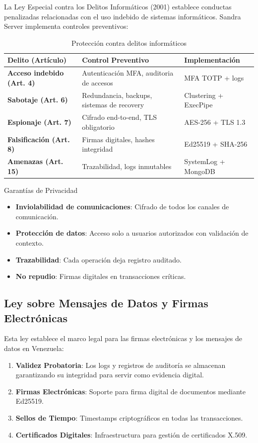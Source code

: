 La Ley Especial contra los Delitos Informáticos (2001) establece conductas penalizadas relacionadas con el uso indebido de sistemas informáticos. Sandra Server implementa controles preventivos:

\begin{table}[H]
\centering
\caption{Protección contra delitos informáticos}
\begin{tabular}{|l|p{6cm}|p{4cm}|}
\hline
\textbf{Delito (Artículo)} & \textbf{Control Preventivo} & \textbf{Implementación} \\ \hline
\textbf{Acceso indebido (Art. 4)} & Autenticación MFA, auditoria de accesos & MFA TOTP + logs \\ \hline
\textbf{Sabotaje (Art. 6)} & Redundancia, backups, sistemas de recovery & Clustering + ExecPipe \\ \hline
\textbf{Espionaje (Art. 7)} & Cifrado end-to-end, TLS obligatorio & AES-256 + TLS 1.3 \\ \hline
\textbf{Falsificación (Art. 8)} & Firmas digitales, hashes integridad & Ed25519 + SHA-256 \\ \hline
\textbf{Amenazas (Art. 15)} & Trazabilidad, logs inmutables & SystemLog + MongoDB \\ \hline
\end{tabular}
\end{table}

\begin{caja}{Garantías de Privacidad}
\begin{itemize}
\item \textbf{Inviolabilidad de comunicaciones}: Cifrado de todos los canales de comunicación.
\item \textbf{Protección de datos}: Acceso solo a usuarios autorizados con validación de contexto.
\item \textbf{Trazabilidad}: Cada operación deja registro auditado.
\item \textbf{No repudio}: Firmas digitales en transacciones críticas.
\end{itemize}
\end{caja}

\subsection{Ley sobre Mensajes de Datos y Firmas Electrónicas}

Esta ley establece el marco legal para las firmas electrónicas y los mensajes de datos en Venezuela:

\begin{enumerate}
\item \textbf{Validez Probatoria}: Los logs y registros de auditoría se almacenan garantizando su integridad para servir como evidencia digital.
\item \textbf{Firmas Electrónicas}: Soporte para firma digital de documentos mediante Ed25519.
\item \textbf{Sellos de Tiempo}: Timestamps criptográficos en todas las transacciones.
\item \textbf{Certificados Digitales}: Infraestructura para gestión de certificados X.509.
\end{enumerate}

